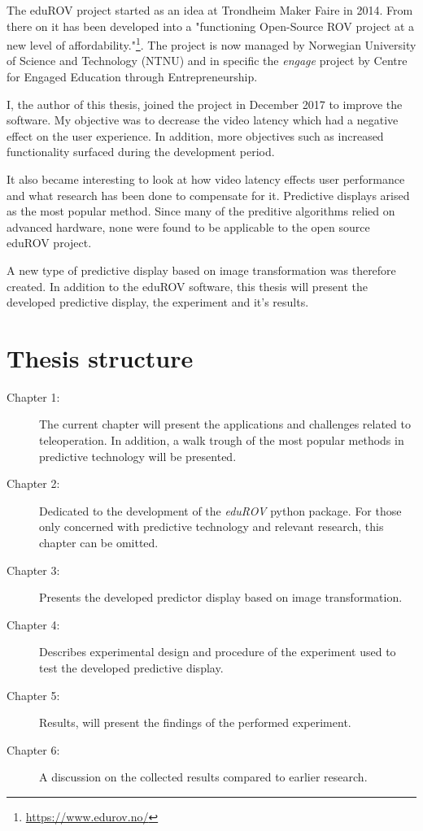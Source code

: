 The eduROV project started as an idea at Trondheim Maker Faire in 2014. From there on it has been developed into a "functioning Open-Source ROV project at a new level of affordability."\footnote{\url{https://www.edurov.no/}}. The project is now managed by Norwegian University of Science and Technology (NTNU) and in specific the \emph{engage} project by Centre for Engaged Education through Entrepreneurship. 

I, the author of this thesis, joined the project in December 2017 to improve the software. My objective was to decrease the video latency which had a negative effect on the user experience. In addition, more objectives such as increased functionality surfaced during the development period.

It also became interesting to look at how video latency effects user performance and what research has been done to compensate for it. Predictive displays arised as the most popular method. Since many of the preditive algorithms relied on advanced hardware, none were found to be applicable to the open source eduROV project.

A new type of predictive display based on image transformation was therefore created. In addition to the eduROV software, this thesis will present the developed predictive display, the experiment and it's results.

\section{Thesis structure}

\begin{description}
\item [Chapter 1:] The current chapter will present the applications and challenges related to teleoperation. In addition, a walk trough of the most popular methods in predictive technology will be presented.

\item [Chapter 2:] Dedicated to the development of the \textit{eduROV} python package. For those only concerned with predictive technology and relevant research, this chapter can be omitted.

\item [Chapter 3:] Presents the developed predictor display based on image transformation.

\item [Chapter 4:] Describes experimental design and procedure of the experiment used to test the developed predictive display.

\item [Chapter 5:] Results, will present the findings of the performed experiment.

\item [Chapter 6:] A discussion on the collected results compared to earlier research.
\end{description}

